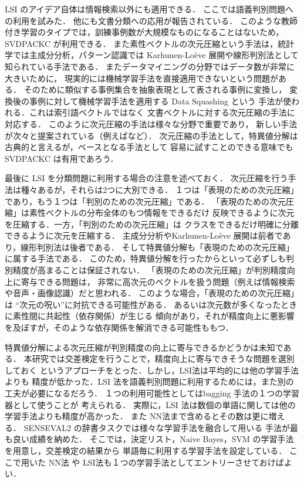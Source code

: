 LSI のアイデア自体は情報検索以外にも適用できる．
ここでは語義判別問題への利用を試みた．
他にも文書分類への応用が報告されている\cite{zelikovitz}．
このような教師付き学習のタイプでは，訓練事例数が大規模なものになることはないため，
SVDPACKC が利用できる．
また素性ベクトルの次元圧縮という手法は，統計学では主成分分析，パターン認識では
Karhunen-Lo\`{e}ve 展開や線形判別法\cite{ishii}として知られている手法である．
またデータマイニングの分野ではデータ数が非常に大きいために，
現実的には機械学習手法を直接適用できないという問題がある．
そのために類似する事例集合を抽象表現として表される事例に変換し，
変換後の事例に対して機械学習手法を適用する Data Squashing という
手法が使われる\cite{suzuki}．これは索引語ベクトルではなく
文書ベクトルに対する次元圧縮の手法に対応する．
このように次元圧縮の手法は様々な分野で重要であり，
新しい手法が次々と提案されている（例えば\cite{suenaga}など）．
次元圧縮の手法として，特異値分解は古典的と言えるが，ベースとなる手法として
容易に試すことのできる意味でも SVDPACKC は有用であろう．

最後に LSI を分類問題に利用する場合の注意を述べておく．
次元圧縮を行う手法は種々あるが，それらは2つに大別できる．
１つは「表現のための次元圧縮」であり，もう１つは「判別のための次元圧縮」である\cite{ishii}．
「表現のための次元圧縮」は素性ベクトルの分布全体のもつ情報をできるだけ
反映できるように次元を圧縮する．一方，「判別のための次元圧縮」は
クラスをできるだけ明確に分離できるように次元を圧縮する．
主成分分析やKarhunen-Lo\`{e}ve 展開は前者であり，線形判別法は後者である．
そして特異値分解も「表現のための次元圧縮」に属する手法である．
このため，特異値分解を行ったからといって必ずしも判別精度が高まることは保証されない．
「表現のための次元圧縮」が判別精度向上に寄与できる問題は，
非常に高次元のベクトルを扱う問題（例えば情報検索や音声・画像認識）だと思われる．
このような場合，「表現のための次元圧縮」は ``次元の呪い''に対抗できる可能性がある．
あるいは次元数が多くなったときに素性間に共起性（依存関係）が生じる
傾向があり，それが精度向上に悪影響を及ぼすが，そのような依存関係を解消できる可能性ももつ．

特異値分解による次元圧縮が判別精度の向上に寄与できるかどうかは未知である．
本研究では交差検定を行うことで，精度向上に寄与できそうな問題を選別しておく
というアプローチをとった．しかし，LSI法は平均的には他の学習手法よりも
精度が低かった．LSI 法を語義判別問題に利用するためには，また別の工夫が必要になるだろう．
１つの利用可能性としてはbagging 手法\cite{breiman96}の１つの学習器として使うことが
考えられる．
実際に，LSI 法は数個の単語に関しては他の学習手法よりも精度が高かった．
また NN法まで含めるとその数は更に増える．
SENSEVAL2 の辞書タスクでは様々な学習手法を融合して用いる
手法が最も良い成績を納めた\cite{murata-sen2}．
そこでは，決定リスト，Naive Bayes，SVM の学習手法を用意し，交差検定の結果から
単語毎に利用する学習手法を設定している．
ここで用いた NN法 や LSI法も１つの学習手法としてエントリーさせておけばよい．

